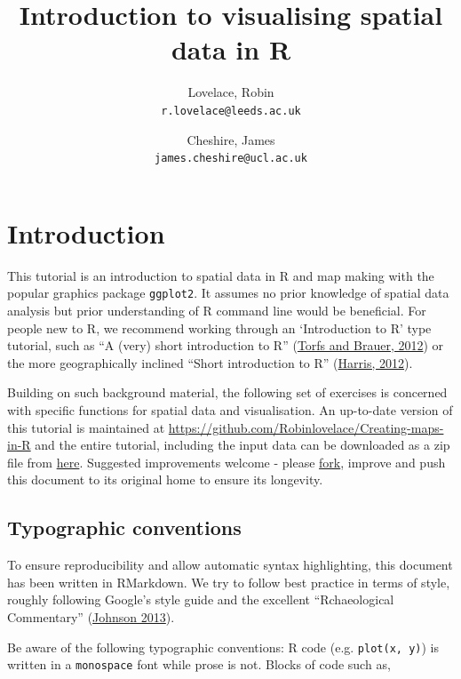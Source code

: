 \documentclass[]{article}
\author{Lovelace, Robin\\
\texttt{r.lovelace@leeds.ac.uk}
\and
Cheshire, James\\
\texttt{james.cheshire@ucl.ac.uk}
}
\title{Introduction to visualising spatial data in R}
\begin{document}
\maketitle

\section{Introduction}

This tutorial is an introduction to spatial data in R and map making
with the popular graphics package \texttt{ggplot2}. It assumes no prior
knowledge of spatial data analysis but prior understanding of R command
line would be beneficial. For people new to R, we recommend working
through an `Introduction to R' type tutorial, such as ``A (very) short
introduction to R''
(\href{http://cran.r-project.org/doc/contrib/Torfs+Brauer-Short-R-Intro.pdf}{Torfs
and Brauer, 2012}) or the more geographically inclined ``Short
introduction to R''
(\href{http://www.social-statistics.org/wp-content/uploads/2012/12/intro\_to\_R1.pdf}{Harris,
2012}).

Building on such background material, the following set of exercises is
concerned with specific functions for spatial data and visualisation. An
up-to-date version of this tutorial is maintained at
\href{https://github.com/Robinlovelace/Creating-maps-in-R/blob/master/intro-spatial-rl.pdf}{https://github.com/Robinlovelace/Creating-maps-in-R}
and the entire tutorial, including the input data can be downloaded as a
zip file from
\href{https://github.com/Robinlovelace/Creating-maps-in-R/archive/master.zip}{here}.
Suggested improvements welcome - please
\href{https://help.github.com/articles/fork-a-repo}{fork}, improve and
push this document to its original home to ensure its longevity.

\subsection{Typographic conventions}

To ensure reproducibility and allow automatic syntax highlighting, this
document has been written in RMarkdown. We try to follow best practice
in terms of style, roughly following Google's style guide and the
excellent ``Rchaeological Commentary''
(\href{http://cran.r-project.org/web/packages/rockchalk/vignettes/Rstyle.pdf}{Johnson
2013}).

Be aware of the following typographic conventions: R code (e.g.
\texttt{plot(x, y)}) is written in a \texttt{monospace} font while prose
is not. Blocks of code such as,
\end{document}

